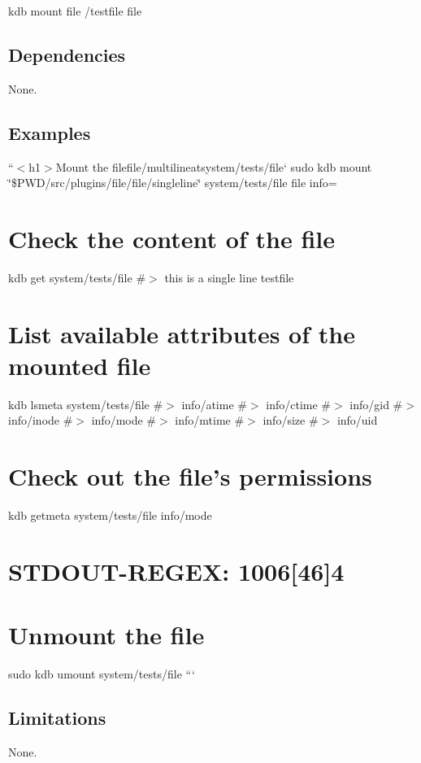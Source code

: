 {\ttfamily kdb mount file /testfile file}

\subsection*{Dependencies}

None.

\subsection*{Examples}

``{\ttfamily  $<$h1$>$Mount the file}file/multiline{\ttfamily at}system/tests/file` sudo kdb mount \char`\"{}\$\+P\+W\+D/src/plugins/file/file/singleline\char`\"{} system/tests/file file info=

\section*{Check the content of the file}

kdb get system/tests/file \#$>$ this is a single line testfile

\section*{List available attributes of the mounted file}

kdb lsmeta system/tests/file \#$>$ info/atime \#$>$ info/ctime \#$>$ info/gid \#$>$ info/inode \#$>$ info/mode \#$>$ info/mtime \#$>$ info/size \#$>$ info/uid

\section*{Check out the file’s permissions}

kdb getmeta system/tests/file info/mode \section*{S\+T\+D\+O\+U\+T-\/\+R\+E\+G\+EX\+: 1006\mbox{[}46\mbox{]}4}

\section*{Unmount the file}

sudo kdb umount system/tests/file ```

\subsection*{Limitations}

None. 